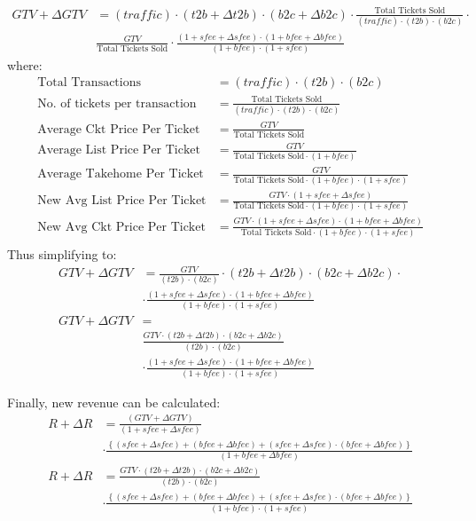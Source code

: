 \documentclass[letterpaper, 12pt]{article}
\begin{document}
\begin{align*}
	GTV +\Delta GTV &= (traffic) \cdot (t2b+\Delta t2b) \cdot (b2c + \Delta b2c) \cdot \frac{\text{Total Tickets Sold}}{(traffic)\cdot(t2b)\cdot(b2c)}\cdot \\
	&\frac{GTV}{\text{Total Tickets Sold}}\cdot \frac{(1+sfee+\Delta sfee)\cdot(1+bfee+\Delta bfee)}{(1+bfee)\cdot(1+sfee)}
\end{align*}
where:
\begin{align*}
\text{Total Transactions} &= (traffic)\cdot(t2b)\cdot(b2c) \\
\text{No. of tickets per transaction}&=\frac{\text{Total Tickets Sold}}{(traffic)\cdot(t2b)\cdot(b2c)} \\
\text{Average Ckt Price Per Ticket} &=	\frac{GTV}{\text{Total Tickets Sold}} \\
\text{Average List Price Per Ticket} &=	\frac{GTV}{\text{Total Tickets Sold}\cdot(1+bfee)} \\
\text{Average Takehome Per Ticket} &=	\frac{GTV}{\text{Total Tickets Sold}\cdot(1+bfee)\cdot(1+sfee)} \\
\text{New Avg List Price Per Ticket}&=\frac{GTV\cdot(1+sfee+\Delta sfee)}{\text{Total Tickets Sold}\cdot(1+bfee)\cdot(1+sfee)}\\ 
\text{New Avg Ckt Price Per Ticket}&=\frac{GTV\cdot(1+sfee+\Delta sfee)\cdot(1+bfee+\Delta bfee)}{\text{Total Tickets Sold}\cdot(1+bfee)\cdot(1+sfee)}\\ 
\end{align*}
Thus simplifying to:
\begin{align*}
	GTV +\Delta GTV &= \frac{GTV}{(t2b)\cdot(b2c)} \cdot (t2b+\Delta t2b) \cdot (b2c + \Delta b2c) \cdot \\
	&\cdot\frac{(1+sfee+\Delta sfee)\cdot(1+bfee+\Delta bfee)}{(1+bfee)\cdot(1+sfee)}\\
	GTV +\Delta GTV &= \\
	&\frac{GTV\cdot (t2b+\Delta t2b) \cdot (b2c + \Delta b2c)}{(t2b)\cdot(b2c)}\\
	&\cdot\frac{(1+sfee+\Delta sfee)\cdot(1+bfee+\Delta bfee)}{(1+bfee)\cdot(1+sfee)}
\end{align*}

\noindent Finally, new revenue can be calculated:
\begin{align*}
R+\Delta R &=\frac{ (GTV+\Delta GTV)}{(1+sfee+\Delta sfee)}\\
&\cdot\frac{\left\{ (sfee+\Delta sfee) + (bfee+\Delta bfee) + (sfee+\Delta sfee)\cdot(bfee+\Delta bfee)\right\}}{(1+bfee+\Delta bfee)}\\
R+\Delta R &=\frac{GTV\cdot (t2b+\Delta t2b) \cdot (b2c + \Delta b2c)}{(t2b)\cdot(b2c)} \\
&\cdot\frac{\left\{ (sfee+\Delta sfee) + (bfee+\Delta bfee) + (sfee+\Delta sfee)\cdot(bfee+\Delta bfee)\right\}}{(1+bfee)\cdot(1+sfee)}
\end{align*}
\end{document}
